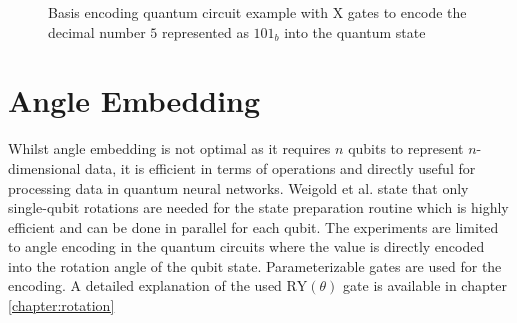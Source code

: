 \begin{figure}[!h]
    \centering
    \caption{Basis encoding quantum circuit example with $\mathrm{X}$ gates to encode the decimal number $5$ represented as $101_b$ into the quantum state}
    \label{fig:basis_embedding_example}
\end{figure}

\section{Angle Embedding}\label{section:angle_embedding}

Whilst angle embedding is not optimal as it requires $n$ qubits to represent $n$-dimensional data, it is efficient in terms of operations and directly useful for processing data in quantum neural networks\cite{Weigold2021_ExpandingDataEncodingPatterns,leymannBitterTruthGatebased2020}. Weigold et al. state that only single-qubit rotations are needed for the state preparation routine which is highly efficient and can be done in parallel for each qubit. \break{}
The experiments are limited to angle encoding in the quantum circuits where the value is directly encoded into the rotation angle of the qubit state. Parameterizable gates\cite{qiskit_rygate_nodate} are used for the encoding. A detailed explanation of the used $\mathrm{RY}(\theta)$ gate is available in chapter \ref{chapter:rotation} \break{}
 
